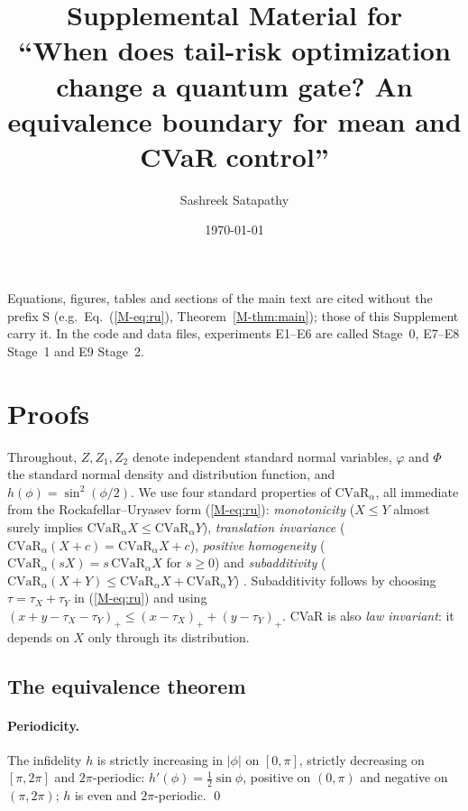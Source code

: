 \documentclass[aps,pra,onecolumn,notitlepage,superscriptaddress,nofootinbib,floatfix]{revtex4-2}
\newcommand{\cvar}{\mathrm{CVaR}}
\begin{document}
\title{Supplemental Material for\\ ``When does tail-risk optimization change a quantum gate?
An equivalence boundary for mean and CVaR control''}
\author{Sashreek Satapathy}
\date{\today}
\maketitle

Equations, figures, tables and sections of the main text are cited without
the prefix S (e.g.\ Eq.~(\ref{M-eq:ru}), Theorem~\ref{M-thm:main}); those of
this Supplement carry it. In the code and data files, experiments E1--E6 are
called Stage~0, E7--E8 Stage~1 and E9 Stage~2.

\tableofcontents
\section{Proofs}
\label{sec:proofs}

Throughout, $Z,Z_1,Z_2$ denote independent standard normal variables,
$\varphi$ and $\Phi$ the standard normal density and distribution function,
and $h(\phi)=\sin^2(\phi/2)$. We use four standard properties of
$\cvar_\alpha$, all immediate from the Rockafellar--Uryasev form
(\ref{M-eq:ru}): \emph{monotonicity} ($X\le Y$ almost surely implies
$\cvar_\alpha X\le\cvar_\alpha Y$), \emph{translation invariance}
($\cvar_\alpha(X+c)=\cvar_\alpha X+c$), \emph{positive homogeneity}
($\cvar_\alpha(sX)=s\,\cvar_\alpha X$ for $s\ge0$) and \emph{subadditivity}
($\cvar_\alpha(X+Y)\le\cvar_\alpha X+\cvar_\alpha Y$)
\cite{Rockafellar2000,Acerbi2002}. Subadditivity follows by choosing
$\tau=\tau_X+\tau_Y$ in (\ref{M-eq:ru}) and using
$(x+y-\tau_X-\tau_Y)_+\le(x-\tau_X)_++(y-\tau_Y)_+$. CVaR is also
\emph{law invariant}: it depends on $X$ only through its distribution.

\subsection{The equivalence theorem}

\paragraph*{Periodicity.} The infidelity $h$ is strictly increasing in $|\phi|$ on $[0,\pi]$, strictly decreasing on $[\pi,2\pi]$ and $2\pi$-periodic: $h'(\phi)=\tfrac12\sin\phi$, positive on
$(0,\pi)$ and negative on $(\pi,2\pi)$; $h$ is even and $2\pi$-periodic.
\qed
\end{document}
